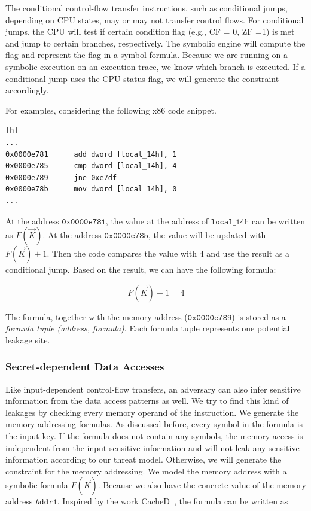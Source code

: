 The conditional control-flow transfer instructions, such as conditional jumps, depending on CPU states, may or may not transfer control flows. For conditional jumps, the CPU will test if certain condition flag
(e.g., CF = 0, ZF =1) is met and jump to certain branches, respectively.
The symbolic engine will compute the flag and represent the flag in a symbol
formula. Because we are running on a symbolic execution on an execution trace, we know which branch is executed.
If a conditional jump uses the CPU status flag, we will generate the constraint accordingly.

For examples, considering the following x86 code snippet.

\begin{lstlisting}[xleftmargin=.2\textwidth, xrightmargin=.2\textwidth, frame=none,numbers=none][h]
...
0x0000e781      add dword [local_14h], 1
0x0000e785      cmp dword [local_14h], 4
0x0000e789      jne 0xe7df
0x0000e78b      mov dword [local_14h], 0
...
\end{lstlisting}

At the address $\mathtt{0x0000e781}$, the value at the address of $\mathtt{local\_14h}$ can be written as $F(\vec{K})$. At the address $\mathtt{0x0000e785}$, the value will be updated with $F(\vec{K})+1$. Then the code compares the value with $4$ and use the result as a conditional jump. Based on the result, we can have the following formula:

$$F(\vec{K}) + 1 = 4$$

The formula, together with the memory address ($\mathtt{0x0000e789}$) is stored as a \textit{formula tuple (address, formula)}. Each formula tuple represents one potential leakage site.

\subsubsection{Secret-dependent Data Accesses}
Like input-dependent control-flow transfers, an adversary can also infer sensitive information from the data access patterns as well. We try to find this kind of leakages by checking every memory operand of the instruction. We generate the memory addressing
formulas. As discussed before, every symbol in the formula is the input key. If the formula does not contain any symbols, the memory access is independent
from the input sensitive information and will not leak any sensitive information according to our threat model. Otherwise, we will generate the constraint for
the memory addressing. We model the memory address with a symbolic formula $F(\vec{K})$. Because we also have the concrete value of the memory address $\mathtt{Addr1}$. Inspired by the work CacheD~\cite{203878}, the formula can be written as

